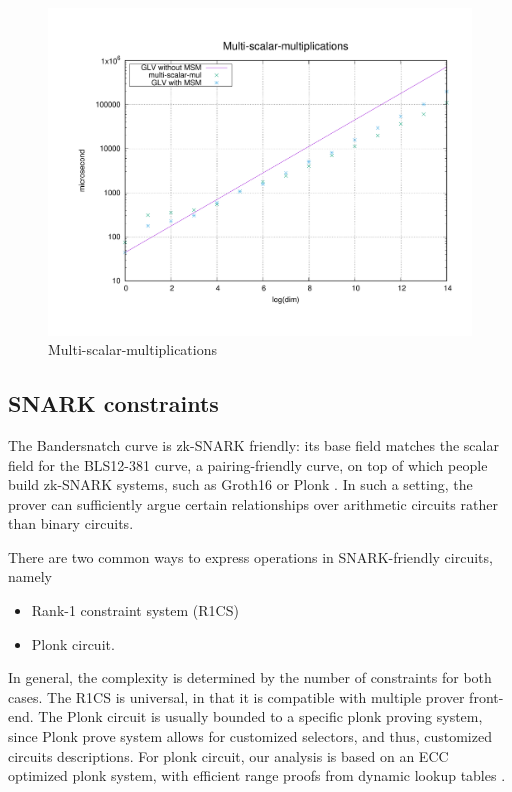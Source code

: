 \documentclass[smallextended]{svjour3}
\begin{document}
\begin{figure}[h]\centering 
  \includegraphics[width=12cm]{fig/msm.pdf}
  \captionsetup{justification=centering}\caption{Multi-scalar-multiplications}\label{fig:msm}
\end{figure}

\subsection{SNARK constraints}
The Bandersnatch curve is zk-SNARK friendly: its 
base field matches the scalar field for the BLS12-381 curve, a 
pairing-friendly curve, on top of which people build zk-SNARK
systems, such as Groth16 \cite{EC:Groth16} or Plonk \cite{EPRINT:GabWilCio19}.
In such a setting, the prover can sufficiently argue certain 
relationships over arithmetic circuits rather than binary
circuits.

There are two common ways to express operations in SNARK-friendly circuits, namely
\begin{itemize}
  \item Rank-1 constraint system
  (R1CS)
  \item Plonk circuit.
\end{itemize}
In general, the complexity is determined by the 
number of constraints for both cases.
The R1CS is universal, in that it is compatible with multiple 
prover front-end. The Plonk circuit is usually bounded to a specific
plonk proving system, since Plonk prove system allows for customized
selectors, and thus, customized circuits descriptions. For plonk
circuit,
our analysis is based on an ECC optimized plonk system, with 
efficient range proofs from dynamic lookup tables \cite{EPRINT:GabWil20}.
\end{document}
